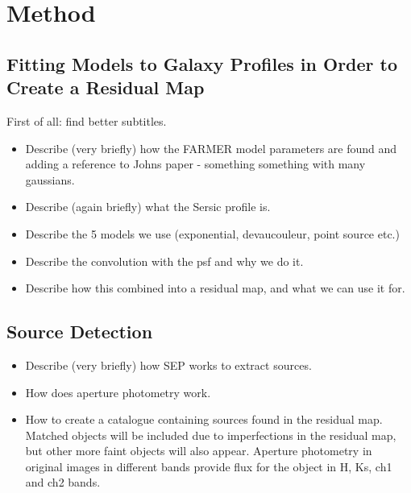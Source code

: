 \section{Method}
\subsection{Fitting Models to Galaxy Profiles in Order to Create a Residual Map}
First of all: find better subtitles.
\begin{itemize}
    \item Describe (very briefly) how the FARMER model parameters are found and adding a reference to Johns paper - something something with many gaussians.
    \item Describe (again briefly) what the Sersic profile is.
    \item Describe the 5 models we use (exponential, devaucouleur, point source etc.)
    \item Describe the convolution with the psf and why we do it.
    \item Describe how this combined into a residual map, and what we can use it for.
\end{itemize}

\subsection{Source Detection}
\begin{itemize}
    \item Describe (very briefly) how SEP works to extract sources.
    \item How does aperture photometry work.
    \item How to create a catalogue containing sources found in the residual map. Matched objects will be included due to imperfections in the residual map, but other more faint objects will also appear. Aperture photometry in original images in different bands provide flux for the object in H, Ks, ch1 and ch2 bands.
\end{itemize}

